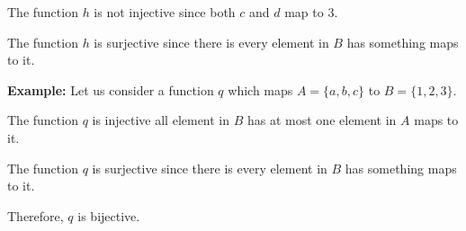 \documentclass[a4paper, 12pt]{article}
\newcommand{\example}{\vspace{1em}\noindent\textbf{Example:} }
\begin{document}
\begin{multicols}{2}
\begin{center}
	\end{center}
	
	The function $h$ is not injective since both $c$ and $d$ map to 3.
		
	The function $h$ is surjective since there is every element in $B$ has something maps to it.
					

	\example Let us consider a function $q$ which maps $A = \{a,b,c\}$ to  $B=\{1,2,3\}$.
	\begin{center}
		
		
	\end{center}
	
	The function $q$ is injective all element in $B$ has at most one element in $A$ maps to it.
	
	The function $q$ is surjective since there is every element in $B$ has something maps to it.
	
	Therefore, $q$ is bijective.
	
	
	
\end{multicols}
\end{document}
